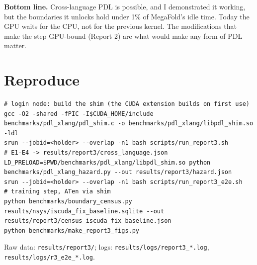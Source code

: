 \documentclass[10pt]{article}
\begin{document}
\textbf{Bottom line.} Cross-language PDL is possible, and I demonstrated it working, but the boundaries it unlocks hold under 1\% of MegaFold's idle time. Today the GPU waits for the CPU, not for the previous kernel. The modifications that make the step GPU-bound (Report 2) are what would make any form of PDL matter.


\section{Reproduce}

\begin{lstlisting}
# login node: build the shim (the CUDA extension builds on first use)
gcc -O2 -shared -fPIC -I$CUDA_HOME/include benchmarks/pdl_xlang/pdl_shim.c -o benchmarks/pdl_xlang/libpdl_shim.so -ldl
srun --jobid=<holder> --overlap -n1 bash scripts/run_report3.sh            # E1-E4 -> results/report3/cross_language.json
LD_PRELOAD=$PWD/benchmarks/pdl_xlang/libpdl_shim.so python benchmarks/pdl_xlang_hazard.py --out results/report3/hazard.json
srun --jobid=<holder> --overlap -n1 bash scripts/run_report3_e2e.sh        # training step, ATen via shim
python benchmarks/boundary_census.py results/nsys/iscuda_fix_baseline.sqlite --out results/report3/census_iscuda_fix_baseline.json
python benchmarks/make_report3_figs.py
\end{lstlisting}
Raw data: \texttt{results/report3/}; logs: \texttt{results/logs/report3\_*.log}, \texttt{results/logs/r3\_e2e\_*.log}.
\end{document}
